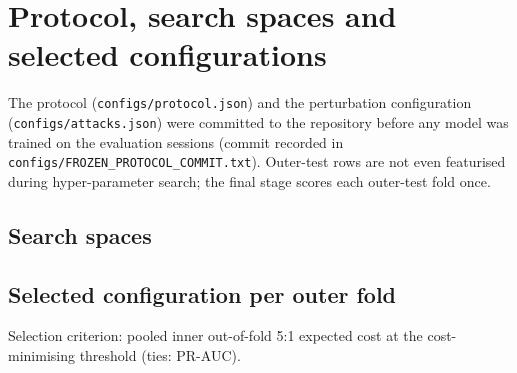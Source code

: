 \section{Protocol, search spaces and selected configurations}
\label{sec:s-protocol}
The protocol (\texttt{configs/\allowbreak protocol.json}) and the perturbation configuration (\texttt{configs/\allowbreak attacks.json}) were committed to the repository before any model was trained on the evaluation sessions (commit recorded in \texttt{configs/\allowbreak FROZEN\_PROTOCOL\_COMMIT.txt}). Outer-test rows are not even featurised during hyper-parameter search; the final stage scores each outer-test fold once.

\subsection{Search spaces}
{\footnotesize}

\subsection{Selected configuration per outer fold}
Selection criterion: pooled inner out-of-fold 5:1 expected cost at the cost-minimising threshold (ties: PR-AUC).
{\footnotesize}
